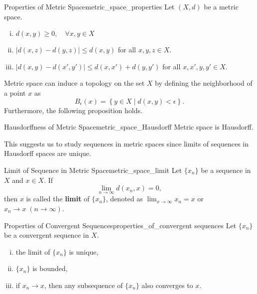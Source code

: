 \documentclass{report}
\begin{document}
\begin{proposition}{Properties of Metric Space}{metric_space_properties}
	Let $(X,d)$ be a metric space.
	\begin{enumerate}[(i)]
		\item $d(x,y)\ge 0,\quad\forall x,y\in X$
		\item $|d(x,z)-d(y,z)|\le d(x,y)$ for all $x,y,z\in X$.
		\item $|d(x,y)-d(x',y')|\le d(x,x')+d(y,y')$ for all $x,x',y,y'\in X$.
	\end{enumerate}
\end{proposition}
Metric space can induce a topology on the set $X$ by defining the neighborhood of a point $x$ as
\[
	B_\epsilon(x)=\left\{y\in X\mid d(x,y)<\epsilon \right\}.
\]
Furthermore, the following proposition holds.

\begin{proposition}{Hausdorffness of Metric Space}{metric_space_Hausdorff}
	Metric space is Hausdorff.
\end{proposition}
This suggests us to study sequences in metric spaces since limits of sequences in Hausdorff spaces are unique.
\begin{definition}{Limit of Sequence in Metric Space}{metric_space_limit}
	Let $\{x_n\}$ be a sequence in $X$ and $x\in X$. If
	\[
		\lim_{n\to\infty}d(x_n,x)=0,
	\]
	then $x$ is called the \textbf{limit} of $\{x_n\}$, denoted as $\lim_{x\to\infty}x_n=x$ or $x_n\to x\;(n\to\infty)$.
\end{definition}

\begin{proposition}{Properties of Convergent Sequences}{properties_of_convergent sequences}
	Let $\{x_n\}$ be a convergent sequence in $X$.
	\begin{enumerate}[(i)]
		\item the limit of $\{x_n\}$ is unique,
		\item $\{x_n\}$ is bounded,
		\item if $x_n\to x$, then any subsequence of $\{x_n\}$ also converges to $x$.
	\end{enumerate}
\end{proposition}
\end{document}
